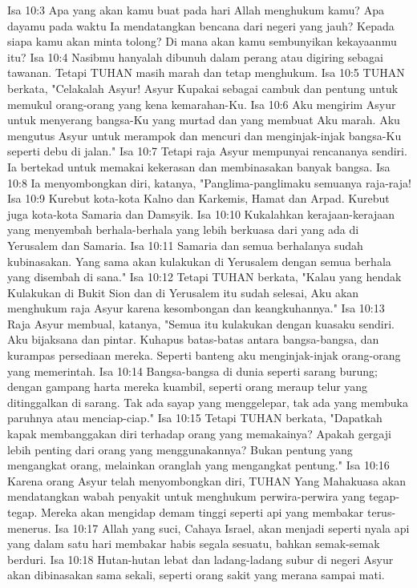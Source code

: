 Isa 10:3  Apa yang akan kamu buat pada hari Allah menghukum kamu? Apa dayamu pada waktu Ia mendatangkan bencana dari negeri yang jauh? Kepada siapa kamu akan minta tolong? Di mana akan kamu sembunyikan kekayaanmu itu?
Isa 10:4  Nasibmu hanyalah dibunuh dalam perang atau digiring sebagai tawanan. Tetapi TUHAN masih marah dan tetap menghukum.
Isa 10:5  TUHAN berkata, "Celakalah Asyur! Asyur Kupakai sebagai cambuk dan pentung untuk memukul orang-orang yang kena kemarahan-Ku.
Isa 10:6  Aku mengirim Asyur untuk menyerang bangsa-Ku yang murtad dan yang membuat Aku marah. Aku mengutus Asyur untuk merampok dan mencuri dan menginjak-injak bangsa-Ku seperti debu di jalan."
Isa 10:7  Tetapi raja Asyur mempunyai rencananya sendiri. Ia bertekad untuk memakai kekerasan dan membinasakan banyak bangsa.
Isa 10:8  Ia menyombongkan diri, katanya, "Panglima-panglimaku semuanya raja-raja!
Isa 10:9  Kurebut kota-kota Kalno dan Karkemis, Hamat dan Arpad. Kurebut juga kota-kota Samaria dan Damsyik.
Isa 10:10  Kukalahkan kerajaan-kerajaan yang menyembah berhala-berhala yang lebih berkuasa dari yang ada di Yerusalem dan Samaria.
Isa 10:11  Samaria dan semua berhalanya sudah kubinasakan. Yang sama akan kulakukan di Yerusalem dengan semua berhala yang disembah di sana."
Isa 10:12  Tetapi TUHAN berkata, "Kalau yang hendak Kulakukan di Bukit Sion dan di Yerusalem itu sudah selesai, Aku akan menghukum raja Asyur karena kesombongan dan keangkuhannya."
Isa 10:13  Raja Asyur membual, katanya, "Semua itu kulakukan dengan kuasaku sendiri. Aku bijaksana dan pintar. Kuhapus batas-batas antara bangsa-bangsa, dan kurampas persediaan mereka. Seperti banteng aku menginjak-injak orang-orang yang memerintah.
Isa 10:14  Bangsa-bangsa di dunia seperti sarang burung; dengan gampang harta mereka kuambil, seperti orang meraup telur yang ditinggalkan di sarang. Tak ada sayap yang menggelepar, tak ada yang membuka paruhnya atau menciap-ciap."
Isa 10:15  Tetapi TUHAN berkata, "Dapatkah kapak membanggakan diri terhadap orang yang memakainya? Apakah gergaji lebih penting dari orang yang menggunakannya? Bukan pentung yang mengangkat orang, melainkan oranglah yang mengangkat pentung."
Isa 10:16  Karena orang Asyur telah menyombongkan diri, TUHAN Yang Mahakuasa akan mendatangkan wabah penyakit untuk menghukum perwira-perwira yang tegap-tegap. Mereka akan mengidap demam tinggi seperti api yang membakar terus-menerus.
Isa 10:17  Allah yang suci, Cahaya Israel, akan menjadi seperti nyala api yang dalam satu hari membakar habis segala sesuatu, bahkan semak-semak berduri.
Isa 10:18  Hutan-hutan lebat dan ladang-ladang subur di negeri Asyur akan dibinasakan sama sekali, seperti orang sakit yang merana sampai mati.
